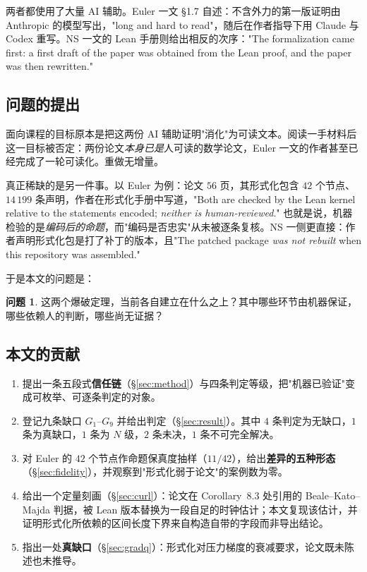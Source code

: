 \documentclass[11pt,a4paper]{ctexart}
\theoremstyle{definition}
\newtheorem{question}[theorem]{问题}
\begin{document}
两者都使用了大量 AI 辅助。Euler 一文 \S1.7 自述：不含外力的第一版证明由 Anthropic 的模型写出，"long and hard to read"，随后在作者指导下用 Claude 与 Codex 重写。NS 一文的 Lean 手册则给出相反的次序："The formalization came first: a first draft of the paper was obtained from the Lean proof, and the paper was then rewritten."

\subsection{问题的提出}

面向课程的目标原本是把这两份 AI 辅助证明"消化"为可读文本。阅读一手材料后这一目标被否定：两份论文\emph{本身已是}人可读的数学论文，Euler 一文的作者甚至已经完成了一轮可读化。重做无增量。

真正稀缺的是另一件事。以 Euler 为例：论文 $56$ 页，其形式化包含 $42$ 个节点、$14\,199$ 条声明，作者在形式化手册中写道，"Both are checked by the Lean kernel relative to the statements encoded; \emph{neither is human-reviewed}." 也就是说，机器检验的是\emph{编码后的命题}，而"编码是否忠实"从未被逐条复核。NS 一侧更直接：作者声明形式化包是打了补丁的版本，且"The patched package \emph{was not rebuilt} when this repository was assembled."

于是本文的问题是：

\begin{question}
这两个爆破定理，当前各自建立在什么之上？其中哪些环节由机器保证，哪些依赖人的判断，哪些尚无证据？
\end{question}

\subsection{本文的贡献}

\begin{enumerate}[label=(\arabic*)]
\item 提出一条五段式\textbf{信任链}（\S\ref{sec:method}）与四条判定等级，把"机器已验证"变成可枚举、可逐条判定的对象。
\item 登记九条缺口 $G_1$--$G_9$ 并给出判定（\S\ref{sec:result}）。其中 $4$ 条判定为无缺口，$1$ 条为真缺口，$1$ 条为 $N$ 级，$2$ 条未决，$1$ 条不可完全解决。
\item 对 Euler 的 $42$ 个节点作命题保真度抽样（$11/42$），给出\textbf{差异的五种形态}（\S\ref{sec:fidelity}），并观察到"形式化弱于论文"的案例数为零。
\item 给出一个定量刻画（\S\ref{sec:curl}）：论文在 Corollary~8.3 处引用的 Beale--Kato--Majda 判据，被 Lean 版本替换为一段自足的时钟估计；本文复现该估计，并证明形式化所依赖的区间长度下界来自构造自带的字段而非导出结论。
\item 指出一处\textbf{真缺口}（\S\ref{sec:gradq}）：形式化对压力梯度的衰减要求，论文既未陈述也未推导。
\end{enumerate}
\end{document}
